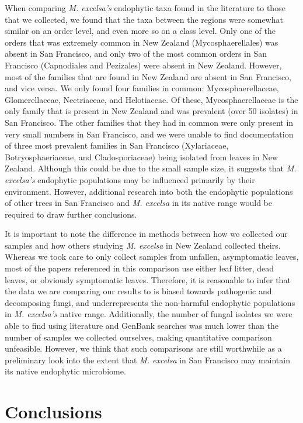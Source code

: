 \documentclass[fleqn,10pt,lineno]{wlpeerj} %
\begin{document}
When comparing \emph{M. excelsa's} endophytic taxa found in the literature to those that we collected, we found that the taxa between the regions were somewhat similar on an order level, and even more so on a class level. Only one of the orders that was extremely common in New Zealand (Mycosphaerellales) was absent in San Francisco, and only two of the most common orders in San Francisco (Capnodiales and Pezizales) were absent in New Zealand. However, most of the families that are found in New Zealand are absent in San Francisco, and vice versa. We only found four families in common: Mycosphaerellaceae, Glomerellaceae, Nectriaceae, and Helotiaceae. Of these, Mycosphaerellaceae is the only family that is present in New Zealand and was prevalent (over 50 isolates) in San Francisco. The other families that they had in common were only present in very small numbers in San Francisco, and we were unable to find documentation of three most prevalent families in San Francisco (Xylariaceae, Botryosphaeriaceae, and Cladosporiaceae) being isolated from leaves in New Zealand. Although this could be due to the small sample size, it suggests that \emph{M. excelsa's} endophytic populations may be influenced primarily by their environment. However, additional research into both the endophytic populations of other trees in San Francisco and \emph{M. excelsa} in its native range would be required to draw further conclusions.

It is important to note the difference in methods between how we collected our samples and how others studying \emph{M. excelsa} in New Zealand collected theirs. Whereas we took care to only collect samples from unfallen, asymptomatic leaves, most of the papers referenced in this comparison use either leaf litter, dead leaves, or obviously symptomatic leaves. Therefore, it is reasonable to infer that the data we are comparing our results to is biased towards pathogenic and decomposing fungi, and underrepresents the non-harmful endophytic populations in \emph{M. excelsa's} native range. Additionally, the number of fungal isolates we were able to find using literature and GenBank searches was much lower than the number of samples we collected ourselves, making quantitative comparison unfeasible. However, we think that such comparisons are still worthwhile as a preliminary look into the extent that \emph{M. excelsa} in San Francisco may maintain its native endophytic microbiome.

\hypertarget{conclusions}{%
\section*{Conclusions}\label{conclusions}}
\end{document}
